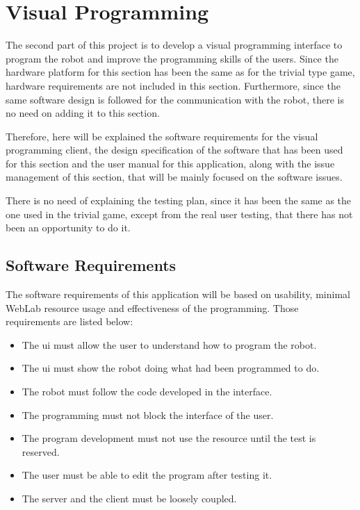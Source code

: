 \section{Visual Programming}

The second part of this project is to develop a visual programming interface to program the robot
and improve the programming skills of the users. Since the hardware platform for this section has
been the same as for the trivial type game, hardware requirements are not included in this section.
Furthermore, since the same software design is followed for the communication with the robot, there
is no need on adding it to this section.

Therefore, here will be explained the software requirements for the visual programming client, the
design specification of the software that has been used for this section and the user manual for
this application, along with the issue management of this section, that will be mainly focused on
the software issues.

There is no need of explaining the testing plan, since it has been the same as the one used in the
trivial game, except from the real user testing, that there has not been an opportunity to do it.

\subsection{Software Requirements}

The software requirements of this application will be based on usability, minimal WebLab resource
usage and effectiveness of the programming. Those requirements are listed below:

\begin{itemize}

	\item The \acrlong{ui} must allow the user to understand how to program the robot.
	\item The \acrlong{ui} must show the robot doing what had been programmed to do.
	\item The robot must follow the code developed in the interface.
	\item The programming must not block the interface of the user.
	\item The program development must not use the resource until the test is reserved.
	\item The user must be able to edit the program after testing it.
	\item The server and the client must be loosely coupled.

\end{itemize}

